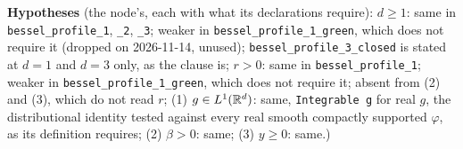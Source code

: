 \begin{lemma}
{%
\textbf{Hypotheses} (the node's, each with what its declarations require): $d \ge 1$: same in
\texttt{bessel\_profile\_1}, \texttt{\_2}, \texttt{\_3}; weaker in \texttt{bessel\_profile\_1\_green},
which does not require it (dropped on 2026-11-14, unused); \texttt{bessel\_profile\_3\_closed} is stated
at $d = 1$ and $d = 3$ only, as the clause is; $r > 0$: same in \texttt{bessel\_profile\_1}; weaker
in \texttt{bessel\_profile\_1\_green}, which does not require it; absent from (2) and (3), which do not
read $r$; (1) $g \in L^1(\mathbb{R}^d)$: same, \texttt{Integrable g} for real $g$, the distributional
identity tested against every real smooth compactly supported $\varphi$, as its definition requires;
(2) $\beta > 0$: same; (3) $y \ge 0$: same.)}
\end{lemma}

